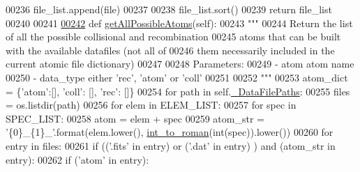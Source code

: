 \begin{DoxyCode}
00236                             file\_list.append(file)
00237                             
00238         file\_list.sort()
00239         \textcolor{keywordflow}{return} file\_list
00240     
00241     
\hypertarget{manage__atomic__data_8py_source_l00242}{}\hyperlink{classpyneb_1_1utils_1_1manage__atomic__data_1_1___manage_atomic_data_a5de7925aac194c157f7fbd243ee25c17}{00242}     \textcolor{keyword}{def }\hyperlink{classpyneb_1_1utils_1_1manage__atomic__data_1_1___manage_atomic_data_a5de7925aac194c157f7fbd243ee25c17}{getAllPossibleAtoms}(self):
00243         \textcolor{stringliteral}{"""}
00244 \textcolor{stringliteral}{        Return the list of all the possible collisional and recombination }
00245 \textcolor{stringliteral}{        atoms that can be built with the available datafiles (not all of }
00246 \textcolor{stringliteral}{        them necessarily included in the current atomic file dictionary) }
00247 \textcolor{stringliteral}{                    }
00248 \textcolor{stringliteral}{        Parameters:}
00249 \textcolor{stringliteral}{           - atom        atom name}
00250 \textcolor{stringliteral}{           - data\_type   either 'rec', 'atom' or 'coll'}
00251 \textcolor{stringliteral}{}
00252 \textcolor{stringliteral}{        """}
00253         atom\_dict = \{\textcolor{stringliteral}{'atom'}:[], \textcolor{stringliteral}{'coll'}: [], \textcolor{stringliteral}{'rec'}: []\}
00254         \textcolor{keywordflow}{for} path \textcolor{keywordflow}{in} self.\hyperlink{classpyneb_1_1utils_1_1manage__atomic__data_1_1___manage_atomic_data_a92da10ed6b2395c54f88300c05a71ae9}{\_DataFilePaths}:
00255             files = os.listdir(path)
00256             \textcolor{keywordflow}{for} elem \textcolor{keywordflow}{in} ELEM\_LIST:
00257                 \textcolor{keywordflow}{for} spec \textcolor{keywordflow}{in} SPEC\_LIST:
00258                     atom = elem + spec
00259                     atom\_str = \textcolor{stringliteral}{'\{0\}\_\{1\}\_'}.format(elem.lower(), \hyperlink{namespacepyneb_1_1utils_1_1misc_aec4e973d4cb9299f749ef190ea636a06}{int\_to\_roman}(int(spec)).lower())
00260                     \textcolor{keywordflow}{for} entry \textcolor{keywordflow}{in} files:
00261                         \textcolor{keywordflow}{if} ((\textcolor{stringliteral}{'.fits'} \textcolor{keywordflow}{in} entry) \textcolor{keywordflow}{or} (\textcolor{stringliteral}{'.dat'} \textcolor{keywordflow}{in} entry) ) \textcolor{keywordflow}{and} (atom\_str \textcolor{keywordflow}{in} entry):
00262                             \textcolor{keywordflow}{if} (\textcolor{stringliteral}{'atom'} \textcolor{keywordflow}{in} entry):

\end{DoxyCode}
